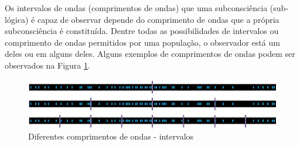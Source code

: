 Os intervalos de ondas (comprimentos de ondas) que uma subconsciência (sub-lógica) é capaz de observar depende do comprimento de ondas que a própria subconsciência é constituída. Dentre todas as possibilidades de intervalos ou comprimento de ondas permitidos por uma população, o observador está um deles ou em alguns deles. Alguns exemplos de comprimentos de ondas podem ser observados na Figura \ref{fig:consciousness_space_subconsciousness_examples}.
	\begin{figure}[H]
	\caption{Diferentes comprimentos de ondas - intervalos}
	\label{fig:consciousness_space_subconsciousness_examples}
	\centering
	\includegraphics[scale=.7]{sections/images/consciousness_space_subconsciousness_examples.jpg}
	\end{figure}

